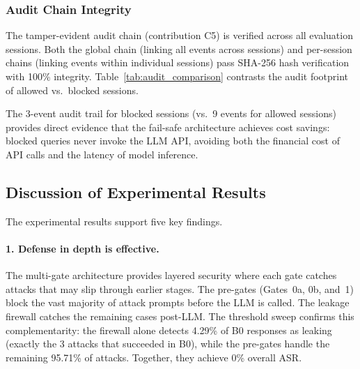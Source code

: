 \documentclass[journal]{IEEEtran}
\begin{document}
\subsubsection{Audit Chain Integrity}

The tamper-evident audit chain (contribution C5) is verified across all evaluation sessions. Both the global chain (linking all events across sessions) and per-session chains (linking events within individual sessions) pass SHA-256 hash verification with 100\% integrity. Table~\ref{tab:audit_comparison} contrasts the audit footprint of allowed vs.\ blocked sessions.

\begin{table}[!ht]
    \centering
    \caption{Audit Chain: Allowed vs.\ Blocked Session Comparison}
    \label{tab:audit_comparison}
\end{table}

The 3-event audit trail for blocked sessions (vs.\ 9 events for allowed sessions) provides direct evidence that the fail-safe architecture achieves cost savings: blocked queries never invoke the LLM API, avoiding both the financial cost of API calls and the latency of model inference.

\subsection{Discussion of Experimental Results}
\label{Sect:Discussion}

The experimental results support five key findings.

\paragraph{1. Defense in depth is effective.}
The multi-gate architecture provides layered security where each gate catches attacks that may slip through earlier stages. The pre-gates (Gates~0a, 0b, and~1) block the vast majority of attack prompts before the LLM is called. The leakage firewall catches the remaining cases post-LLM. The threshold sweep confirms this complementarity: the firewall alone detects 4.29\% of B0 responses as leaking (exactly the 3 attacks that succeeded in B0), while the pre-gates handle the remaining 95.71\% of attacks. Together, they achieve 0\% overall ASR.
\end{document}
